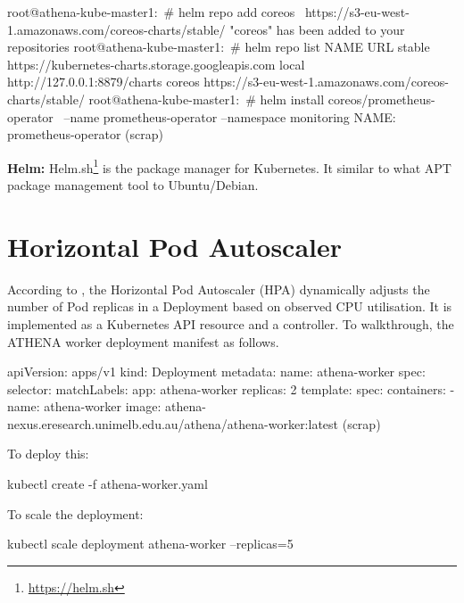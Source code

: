 \begin{small}
\begin{lcverbatim}
root@athena-kube-master1:~# helm repo add coreos \
	 https://s3-eu-west-1.amazonaws.com/coreos-charts/stable/
"coreos" has been added to your repositories
root@athena-kube-master1:~# helm repo list
NAME  	URL
stable	https://kubernetes-charts.storage.googleapis.com
local 	http://127.0.0.1:8879/charts
coreos	https://s3-eu-west-1.amazonaws.com/coreos-charts/stable/
root@athena-kube-master1:~# helm install coreos/prometheus-operator \
	--name prometheus-operator --namespace monitoring
NAME:   prometheus-operator
(scrap)
\end{lcverbatim}
\end{small}

\noindent \textbf{Helm:} \quad Helm.sh\footnote{\url{https://helm.sh}} is the package manager for Kubernetes. It similar to what APT package management tool to Ubuntu/Debian.

\section{Horizontal Pod Autoscaler}

According to \parencite{kubeDoc}, the Horizontal Pod Autoscaler (HPA) dynamically adjusts the number of Pod replicas in a Deployment based on observed CPU utilisation. It is implemented as a Kubernetes API resource and a controller. To walkthrough, the ATHENA worker deployment manifest as follows.

\begin{small}
\begin{lcverbatim}
apiVersion: apps/v1
kind: Deployment
metadata:
  name: athena-worker
spec:
  selector:
    matchLabels:
      app: athena-worker
  replicas: 2
  template:
    spec:
      containers:
      - name: athena-worker
        image: athena-nexus.eresearch.unimelb.edu.au/athena/athena-worker:latest
(scrap)        
\end{lcverbatim}
\end{small}

\noindent To deploy this:

\begin{small}
\begin{lcverbatim}
kubectl create -f athena-worker.yaml
\end{lcverbatim}
\end{small}

\noindent To scale the deployment:
\begin{small}
\begin{lcverbatim}
kubectl scale deployment athena-worker --replicas=5
\end{lcverbatim}
\end{small}

